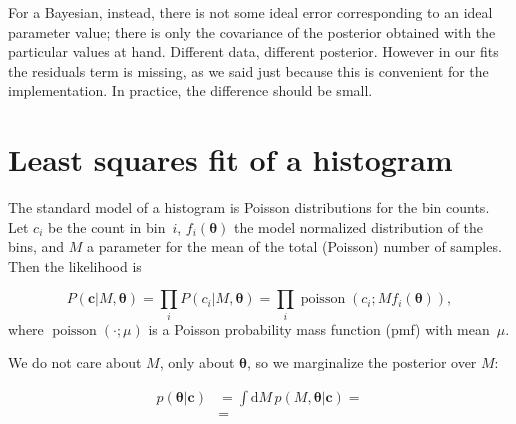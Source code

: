 For a Bayesian, instead, there is not some ideal error corresponding to an
ideal parameter value; there is only the covariance of the posterior obtained
with the particular values at hand. Different data, different posterior.
However in our fits the residuals term is missing, as we said just because this
is convenient for the implementation. In practice, the difference should be
small.

\section{Least squares fit of a histogram}

The standard model of a histogram is Poisson distributions for the bin counts.
Let $c_i$ be the count in bin~$i$, $f_i(\boldsymbol\theta)$ the model
normalized distribution of the bins, and $M$ a parameter for the mean of the
total (Poisson) number of samples. Then the likelihood is

\begin{equation}
    P(\mathbf c|M,\boldsymbol\theta) =
    \prod_i P(c_i|M,\boldsymbol\theta) =
    \prod_i \operatorname{poisson}(c_i;Mf_i(\boldsymbol\theta)),
\end{equation}
%
where $\operatorname{poisson}(\cdot;\mu)$ is a Poisson probability mass
function (pmf) with mean~$\mu$.

We do not care about $M$, only about $\boldsymbol\theta$, so we marginalize
the posterior over $M$:

\begin{align}
    p(\boldsymbol\theta|\mathbf c)
    &= \int \mathrm dM\, p(M,\boldsymbol\theta|\mathbf c) = \\
    &= 
\end{align}

